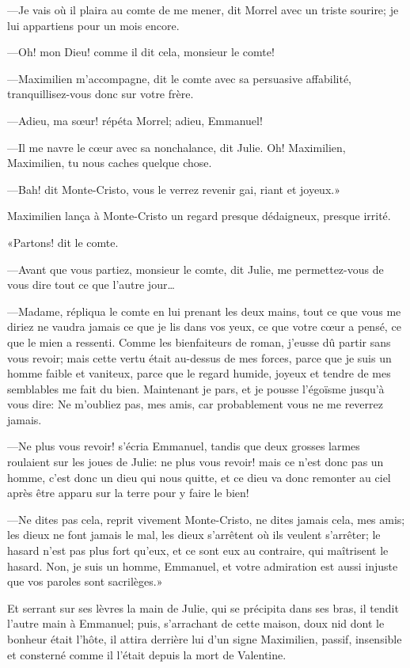 —Je vais où il plaira au comte de me mener, dit Morrel avec un triste sourire; je lui appartiens pour un mois encore. 

—Oh! mon Dieu! comme il dit cela, monsieur le comte! 

—Maximilien m'accompagne, dit le comte avec sa persuasive affabilité, tranquillisez-vous donc sur votre frère. 

—Adieu, ma sœur! répéta Morrel; adieu, Emmanuel! 

—Il me navre le cœur avec sa nonchalance, dit Julie. Oh! Maximilien, Maximilien, tu nous caches quelque chose. 

—Bah! dit Monte-Cristo, vous le verrez revenir gai, riant et joyeux.» 

Maximilien lança à Monte-Cristo un regard presque dédaigneux, presque irrité. 

«Partons! dit le comte. 

—Avant que vous partiez, monsieur le comte, dit Julie, me permettez-vous de vous dire tout ce que l'autre jour\dots 

—Madame, répliqua le comte en lui prenant les deux mains, tout ce que vous me diriez ne vaudra jamais ce que je lis dans vos yeux, ce que votre cœur a pensé, ce que le mien a ressenti. Comme les bienfaiteurs de roman, j'eusse dû partir sans vous revoir; mais cette vertu était au-dessus de mes forces, parce que je suis un homme faible et vaniteux, parce que le regard humide, joyeux et tendre de mes semblables me fait du bien. Maintenant je pars, et je pousse l'égoïsme jusqu'à vous dire: Ne m'oubliez pas, mes amis, car probablement vous ne me reverrez jamais. 

—Ne plus vous revoir! s'écria Emmanuel, tandis que deux grosses larmes roulaient sur les joues de Julie: ne plus vous revoir! mais ce n'est donc pas un homme, c'est donc un dieu qui nous quitte, et ce dieu va donc remonter au ciel après être apparu sur la terre pour y faire le bien! 

—Ne dites pas cela, reprit vivement Monte-Cristo, ne dites jamais cela, mes amis; les dieux ne font jamais le mal, les dieux s'arrêtent où ils veulent s'arrêter; le hasard n'est pas plus fort qu'eux, et ce sont eux au contraire, qui maîtrisent le hasard. Non, je suis un homme, Emmanuel, et votre admiration est aussi injuste que vos paroles sont sacrilèges.» 

Et serrant sur ses lèvres la main de Julie, qui se précipita dans ses bras, il tendit l'autre main à Emmanuel; puis, s'arrachant de cette maison, doux nid dont le bonheur était l'hôte, il attira derrière lui d'un signe Maximilien, passif, insensible et consterné comme il l'était depuis la mort de Valentine. 

